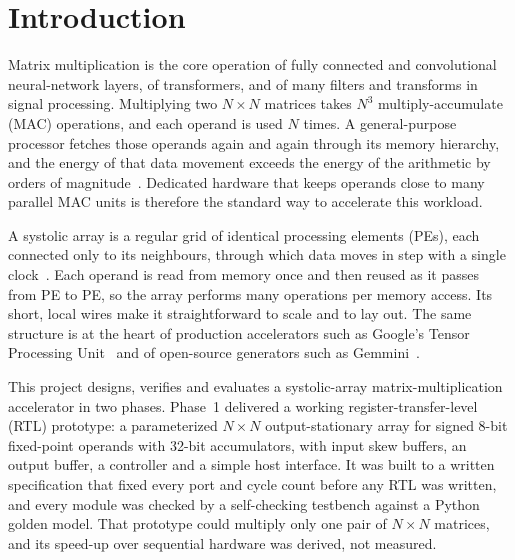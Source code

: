 
\section{Introduction}
Matrix multiplication is the core operation of fully connected and convolutional neural-network layers, of transformers, and of many filters and transforms in signal processing. Multiplying two $N \times N$ matrices takes $N^3$ multiply-accumulate (MAC) operations, and each operand is used $N$ times. A general-purpose processor fetches those operands again and again through its memory hierarchy, and the energy of that data movement exceeds the energy of the arithmetic by orders of magnitude~\cite{horowitz2014energy, sze2017efficient}. Dedicated hardware that keeps operands close to many parallel MAC units is therefore the standard way to accelerate this workload.

A systolic array is a regular grid of identical processing elements (PEs), each connected only to its neighbours, through which data moves in step with a single clock~\cite{kung1979systolic, kung1982systolic}. Each operand is read from memory once and then reused as it passes from PE to PE, so the array performs many operations per memory access. Its short, local wires make it straightforward to scale and to lay out. The same structure is at the heart of production accelerators such as Google's Tensor Processing Unit~\cite{jouppi2017tpu} and of open-source generators such as Gemmini~\cite{genc2021gemmini}.

This project designs, verifies and evaluates a systolic-array matrix-multiplication accelerator in two phases. Phase~1 delivered a working register-transfer-level (RTL) prototype: a parameterized $N \times N$ output-stationary array for signed 8-bit fixed-point operands with 32-bit accumulators, with input skew buffers, an output buffer, a controller and a simple host interface. It was built to a written specification that fixed every port and cycle count before any RTL was written, and every module was checked by a self-checking testbench against a Python golden model. That prototype could multiply only one pair of $N \times N$ matrices, and its speed-up over sequential hardware was derived, not measured.

